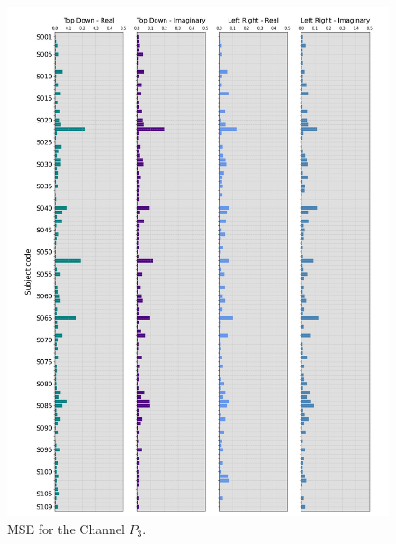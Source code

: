 \documentclass[11pt, aspectratio=169]{beamer}
\begin{document}
\begin{frame}
\begin{figure}[ht]
\begin{minipage}[b]{0.21\linewidth}
      \includegraphics[height=.5\paperheight]{../Figures/art_02/Fig12.jpg}
      \caption{MSE for the Channel $P_{3}$.}
      \label{fig23}
    \end{minipage}
    \hspace{0.2cm}
    \begin{minipage}[b]{0.21\linewidth}
      \centering

\end{minipage}
\end{figure}
\end{frame}
\end{document}
